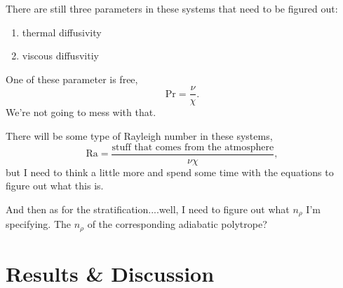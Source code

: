 \documentclass[aps, pre, onecolumn, nofootinbib, notitlepage, groupedaddress, amsfonts, amssymb, amsmath, longbibliography]{revtex4-1}
\begin{document}
There are still three parameters in these systems that need to be figured out:
\begin{enumerate}
\item thermal diffusivity
\item viscous diffusvitiy
\end{enumerate}
One of these parameter is free,
\begin{equation}
\text{Pr} = \frac{\nu}{\chi}.
\end{equation}
We're not going to mess with that.

There will be some type of Rayleigh number in these systems,
\begin{equation}
\text{Ra} = \frac{\text{stuff that comes from the atmosphere}}{\nu \chi},
\end{equation}
but I need to think a little more and spend some time with the equations to
figure out what this is.

And then as for the stratification....well, I need to figure out what $n_{\rho}$ I'm specifying.
The $n_\rho$ of the corresponding adiabatic polytrope?  

\section{Results \& Discussion}
\label{sec:results}


\end{document}

